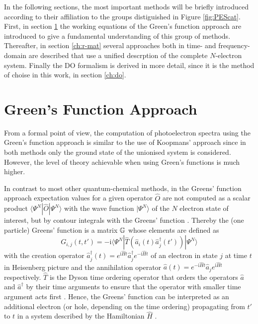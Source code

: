 In the following sections, the most important methods will be briefly introduced according to their affiliation to the groups distiguished in Figure \ref{fig:PEScat}.
First, in section \ref{ch:gf} the working equations of the Green's function approach are introduced to give a fundamental understanding of this group of methods.
Thereafter, in section \ref{ch:r-mat} several approaches both in time- and frequency-domain are described that use a unified descrption of the complete $N$-electron system.
Finally the DO formalism is derived in more detail, since it is the method of choise in this work, in section \ref{ch:do}.

\section{Green's Function Approach}
\label{ch:gf}
From a formal point of view, the computation of photoelectron spectra using the Green's function approach is similar to the use of Koopmans' approach since in both methods only the ground state of the unionised system is considered.
However, the level of theory achievable when using Green's functions is much higher.

In contrast to most other quantum-chemical methods, in the Greens' function approach expectation values for a given operator $\hat{O}$ are not computed as a scalar product $\langle \Psi^N |\hat{O} | \Psi^N \rangle $ with the wave function $|\Psi^N\rangle$ of the $N$ electron state of interest, but by contour integrals with the Greens' function \cite{bookGF, 1pGFcederbaum}.
Thereby the (one particle) Greens' function is a matrix $\mathbb{G}$ whose elements are defined as
\begin{equation} \label{eq:defGF}
G_{i,j}(t,t')= -\text{i}\langle \Psi^N | \hat{T}\left(\hat{a}_i(t)\hat{a}_j^\dagger(t')\right)|\Psi^N\rangle 
\end{equation}
with the creation operator $\hat{a}^\dagger_j (t)=e^{\text{i}\hat{H}t}\hat{a}^\dagger_j e^{-\text{i}\hat{H}t}$ of an electron in state $j$ at time $t$ in Heisenberg picture and the annihilation operator $\hat{a}(t)=e^{-\text{i}\hat{H}t}\hat{a}_j e^{\text{i}\hat{H}t}$ respectively.
$\hat{T}$ is the Dyson time ordering operator that orders the operators $\hat{a}$ and $\hat{a}^\dagger$ by their time arguments to ensure that the operator with smaller time argument acts first \cite{bookGF}.
Hence, the Greens' function can be interpreted as an additional electron (or hole, depending on the time ordering) propagating from $t'$ to $t$ in a system described by the Hamiltonian $\hat{H}$ \cite{bookGF}.

